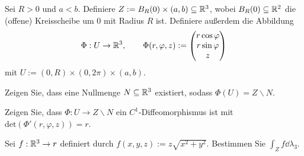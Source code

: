 \begin{Problem}\label{pr:advanalblatt10-1}
	Sei $R>0$ und $a<b$. Definiere $Z:=B_R(0)\times (a,b)\subseteq \mathbb{R}^3$, wobei $B_R(0)\subseteq \mathbb{R}^2$ die (offene) Kreisscheibe um $0$ mit Radius $R$ ist. Definiere außerdem die Abbildung
	\[
	\Phi:U\to \mathbb{R}^3, \qquad \Phi(r,\varphi,z):=\begin{pmatrix} r\cos\varphi \\ r\sin\varphi \\ z \end{pmatrix} 
\]
mit $U:=(0,R)\times (0,2\pi)\times (a,b)$.
\begin{parts}
	\item Zeigen Sie, dass eine Nullmenge $N\subseteq \mathbb{R}^3$ existiert, sodass $\Phi(U)=Z\backslash N$.
	\item Zeigen Sie, dass $\Phi:U\to Z \backslash N$ ein $C^1$-Diffeomorphismus ist mit $\text{det}(\Phi'(r,\varphi,z))=r$.
	\item Sei $f:\mathbb{R}^3\to r$ definiert durch $f(x,y,z):=z\sqrt{x^2+y^2} $. Bestimmen Sie $\int_Z f\dd{\lambda_3}$.
\end{parts}
\end{Problem}
